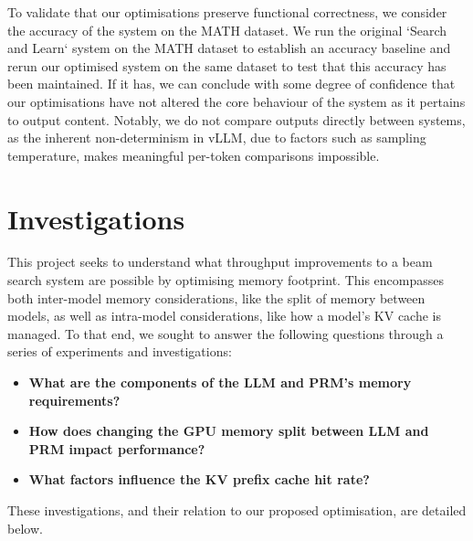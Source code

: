 \documentclass[12pt,twoside]{report}
\begin{document}
To validate that our optimisations preserve functional correctness, we consider the accuracy of the system on the MATH dataset. 
We run the original `Search and Learn` system on the MATH dataset to establish an accuracy baseline and rerun our optimised system on the same dataset to test that this accuracy has been maintained.
If it has, we can conclude with some degree of confidence that our optimisations have not altered the core behaviour of the system as it pertains to output content.
Notably, we do not compare outputs directly between systems, as the inherent non-determinism in vLLM, due to factors such as sampling temperature, makes meaningful per-token comparisons impossible.

\chapter{Investigations}

This project seeks to understand what throughput improvements to a beam search system are possible by optimising memory footprint.
This encompasses both inter-model memory considerations, like the split of memory between models, as well as intra-model considerations, like how a model's KV cache is managed.
To that end, we sought to answer the following questions through a series of experiments and investigations:
\begin{itemize}
    \item \textbf{What are the components of the LLM and PRM's memory requirements?}
    \item \textbf{How does changing the GPU memory split between LLM and PRM impact performance?}
    \item \textbf{What factors influence the KV prefix cache hit rate?}
\end{itemize}
These investigations, and their relation to our proposed optimisation, are detailed below.
\end{document}
